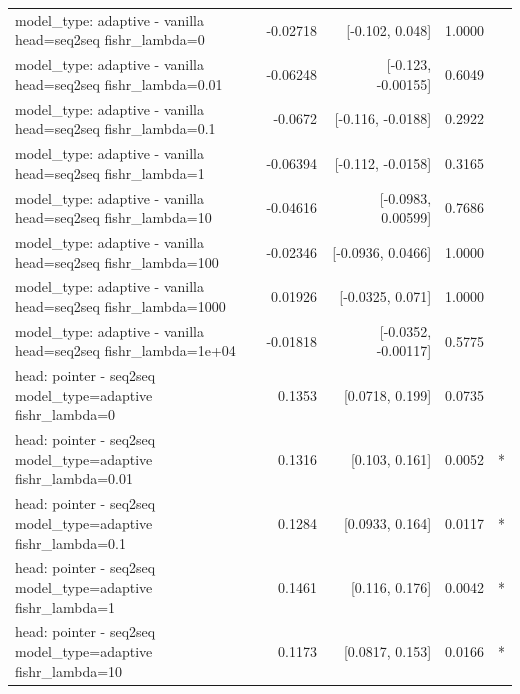 \documentclass[10pt]{article}
\makeatletter
\newcommand{\stackcell}[1]{\begin{tabular}[t]{@{}l@{}}#1\end{tabular}}
\makeatother
\begin{document}
{\begin{longtable}{lrrrl}
\stackcell{model\_type: adaptive - vanilla\\\footnotesize head=seq2seq fishr\_lambda=0 } & -0.02718 & [-0.102, 0.048] & 1.0000 & \\
\stackcell{model\_type: adaptive - vanilla\\\footnotesize head=seq2seq fishr\_lambda=0.01 } & -0.06248 & [-0.123, -0.00155] & 0.6049 & \\
\stackcell{model\_type: adaptive - vanilla\\\footnotesize head=seq2seq fishr\_lambda=0.1 } & -0.0672 & [-0.116, -0.0188] & 0.2922 & \\
\stackcell{model\_type: adaptive - vanilla\\\footnotesize head=seq2seq fishr\_lambda=1 } & -0.06394 & [-0.112, -0.0158] & 0.3165 & \\
\stackcell{model\_type: adaptive - vanilla\\\footnotesize head=seq2seq fishr\_lambda=10 } & -0.04616 & [-0.0983, 0.00599] & 0.7686 & \\
\stackcell{model\_type: adaptive - vanilla\\\footnotesize head=seq2seq fishr\_lambda=100 } & -0.02346 & [-0.0936, 0.0466] & 1.0000 & \\
\stackcell{model\_type: adaptive - vanilla\\\footnotesize head=seq2seq fishr\_lambda=1000 } & 0.01926 & [-0.0325, 0.071] & 1.0000 & \\
\stackcell{model\_type: adaptive - vanilla\\\footnotesize head=seq2seq fishr\_lambda=1e+04 } & -0.01818 & [-0.0352, -0.00117] & 0.5775 & \\
\stackcell{head: pointer - seq2seq\\\footnotesize model\_type=adaptive fishr\_lambda=0 } & 0.1353 & [0.0718, 0.199] & 0.0735 & \\
\stackcell{head: pointer - seq2seq\\\footnotesize model\_type=adaptive fishr\_lambda=0.01 } & 0.1316 & [0.103, 0.161] & 0.0052 & *\\
\stackcell{head: pointer - seq2seq\\\footnotesize model\_type=adaptive fishr\_lambda=0.1 } & 0.1284 & [0.0933, 0.164] & 0.0117 & *\\
\stackcell{head: pointer - seq2seq\\\footnotesize model\_type=adaptive fishr\_lambda=1 } & 0.1461 & [0.116, 0.176] & 0.0042 & *\\
\stackcell{head: pointer - seq2seq\\\footnotesize model\_type=adaptive fishr\_lambda=10 } & 0.1173 & [0.0817, 0.153] & 0.0166 & *\\

\end{longtable}}
\end{document}
